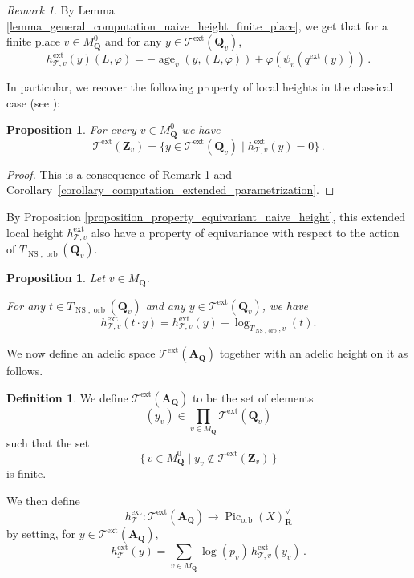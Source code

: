 \documentclass{proc-l}
\newcommand{\R}{\mathbf{R}}
\newcommand{\Z}{\mathbf{Z}}
\newcommand{\Q}{\mathbf{Q}}
\DeclareMathOperator{\Pic}{Pic}
\DeclareMathOperator{\age}{age}
\DeclareMathOperator{\NS}{NS}
\DeclareMathOperator{\orb}{orb}
\DeclareMathOperator{\ext}{ext}
\newcommand{\stackT}{\mathcal{T}}
\newcommand{\affine}{\mathbf{A}}
\newtheorem{prop}[theorem]{Proposition}
\theoremstyle{definition}
\newtheorem{definition}[theorem]{Definition}
\theoremstyle{remark}
\newtheorem{remark}[theorem]{Remark}
\numberwithin{equation}{section}
\begin{document}
\begin{remark}\label{remark_forme_classique_extended_local_height_finite_place}
    By Lemma \ref{lemma_general_computation_naive_height_finite_place}, we get that for a finite place $v \in M_{\Q}^0$ and for any $y \in \stackT^{\ext}(\Q_v)$,
    $$h_{\stackT,v}^{\ext}(y)(L,\varphi) = - \age_v\left(y,(L,\varphi)\right) + \varphi\!\left(\psi_v\!\left(q^{\ext}(y)\right)\right) \, .$$
\end{remark}

In particular, we recover the following property of local heights in the classical case (see \cite[Lemma~4.30 (ii)]{Peyre_beyond_height}):


\begin{prop}\label{proposition_forme_classique_parametrisation_entiere_locale}
For every $v \in M_{\Q}^0$ we have
$$
\stackT^{\ext}(\Z_v)
=
\{ y \in \stackT^{\ext}(\Q_v) \mid h_{\stackT,v}^{\ext}(y) = 0 \} \, .
$$
\end{prop}

\begin{proof}
    This is a consequence of Remark \ref{remark_forme_classique_extended_local_height_finite_place} and Corollary~\ref{corollary_computation_extended_parametrization}.
\end{proof}

By Proposition \ref{proposition_property_equivariant_naive_height}, this extended local height $h_{\stackT,v}^{\ext}$ also have a property of equivariance with respect to the action of $T_{\NS,\orb}(\Q_v)$.

\begin{prop}\label{proposition_property_equivariant_extended_height}
Let $v \in M_{\Q}$.

For any $t \in T_{\NS,\orb}(\Q_v)$ and any $y \in \stackT^{\ext}(\Q_v)$, we have
\[
h_{\stackT,v}^{\ext}(t \cdot y)
=
h_{\stackT,v}^{\ext}(y)
+
\log_{T_{\NS,\orb},v}(t).
\]
\end{prop}


We now define an adelic space $\stackT^{\ext}(\affine_{\Q})$ together with an adelic height on it as follows.

\begin{definition}
We define $\stackT^{\ext}(\affine_{\Q})$ to be the set of elements
$$
(y_v) \in \prod_{v \in M_{\Q}} \stackT^{\ext}(\Q_v)
$$
such that the set
$$
\{\, v \in M_{\Q}^0 \mid y_v \notin \stackT^{\ext}(\Z_v) \,\}
$$
is finite.

We then define
$$
h_{\stackT}^{\ext} : \stackT^{\ext}(\affine_{\Q}) \longrightarrow \Pic_{\orb}(X)^{\vee}_{\R}
$$
by setting, for $y \in \stackT^{\ext}(\affine_{\Q})$,
$$
h_{\stackT}^{\ext}(y)
=
\sum_{v \in M_{\Q}}
\log(p_v)\,
h^{\ext}_{\stackT,v}(y_v) \, .
$$
\end{definition}
\end{document}

